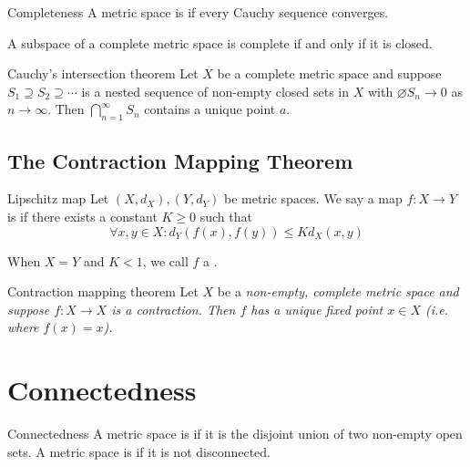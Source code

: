 \documentclass{styles/tufte}
\begin{document}
\begin{definition}{Completeness}{}
  A metric space is  if every Cauchy sequence converges.
\end{definition}

\begin{proposition}{}{}
  A subspace of a complete metric space is complete if and only if it is closed.
\end{proposition}

\begin{lemma}{Cauchy's intersection theorem}{}
  Let $X$ be a complete metric space and suppose $S_1 \supseteq S_2 \supseteq \cdots$ is a nested sequence of non-empty closed sets in $X$ with $\diameter S_n \to 0$ as $n \to \infty$. Then $\bigcap_{n=1}^\infty S_n$ contains a unique point $a$.
\end{lemma}


\subsection{The Contraction Mapping Theorem}
  
  \begin{definition}{Lipschitz map}{}
    Let $(X, d_X), (Y, d_Y)$ be metric spaces. We say a map $f: X \to Y$ is  if there exists a constant $K \geqslant 0$ such that
    \[ \forall x, y \in X: d_Y(f(x), f(y)) \leqslant K d_X(x, y) \]
    
    When $X = Y$ and $K < 1$, we call $f$ a .
  \end{definition}
  
  \begin{theorem}{Contraction mapping theorem}{}
    Let $X$ be a \em{non-empty}, \em{complete} metric space and suppose $f: X \to X$ is a contraction. Then $f$ has a unique fixed point $x \in X$ (i.e. where $f(x) = x$).
  \end{theorem}



\section{Connectedness}

\begin{definition}{Connectedness}{}
  A metric space is  if it is the disjoint union of two non-empty open sets. A metric space is  if it is not disconnected.
\end{definition}
\end{document}
